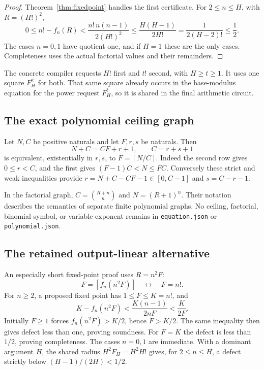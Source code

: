 \documentclass[11pt,letterpaper]{article}
\theoremstyle{definition}
\theoremstyle{remark}
\newcommand{\ceil}[1]{\left\lceil#1\right\rceil}
\newcommand{\file}[1]{\nolinkurl{#1}}
\begin{document}
\begin{proof}
Theorem~\ref{thm:fixedpoint} handles the first certificate. For
$2\le n\le H$, with $R=(H!)^2$,
\[
 0\le n!-f_n(R)
 <\frac{n!\,n(n-1)}{2(H!)^2}
 \le\frac{H(H-1)}{2H!}
 =\frac{1}{2(H-2)!}\le\frac12.
\]
The cases $n=0,1$ have quotient one, and if $H=1$ these are the only
cases. Completeness uses the actual factorial values and their remainders.
\end{proof}

The concrete compiler requests $H!$ first and $t!$ second, with
$H\ge t\ge1$. It uses one square $F_H^2$ for both.
That same square already occurs in the base-modulus equation for the
power request $F_H^t$, so it is shared in the final arithmetic circuit.

\subsection{The exact polynomial ceiling graph}

Let $N,C$ be positive naturals and let $F,r,s$ be naturals. Then
\begin{equation}\label{eq:ceiling-graph}
       N+C=CF+r+1,\qquad C=r+s+1
\end{equation}
is equivalent, existentially in $r,s$, to $F=\ceil{N/C}$.
Indeed the second row gives $0\le r<C$, and the first gives
$(F-1)C<N\le FC$. Conversely these strict and weak inequalities provide
$r=N+C-CF-1\in[0,C-1]$ and $s=C-r-1$.

In the factorial graph, $C=\binom{R+n}{n}$ and $N=(R+1)^n$.
Their notation describes the semantics of separate finite polynomial
graphs. No ceiling, factorial, binomial symbol, or variable exponent
remains in \file{equation.json} or \file{polynomial.json}.

\subsection{The retained output-linear alternative}

An especially short fixed-point proof uses $R=n^2F$:
\begin{equation}\label{eq:linear-radius}
 F=\ceil{f_n(n^2F)}\quad\longleftrightarrow\quad F=n!.
\end{equation}
For $n\ge2$, a proposed fixed point has $1\le F\le K=n!$, and
\[
 K-f_n(n^2F)<\frac{K(n-1)}{2nF}<\frac{K}{2F}.
\]
Initially $F\ge1$ forces $f_n(n^2F)>K/2$, hence $F>K/2$.
The same inequality then gives defect less than one, proving soundness.
For $F=K$ the defect is less than $1/2$, proving completeness.
The cases $n=0,1$ are immediate. With a dominant argument $H$, the
shared radius $H^2F_H=H^2H!$ gives, for $2\le n\le H$, a defect
strictly below $(H-1)/(2H)<1/2$.
\end{document}
